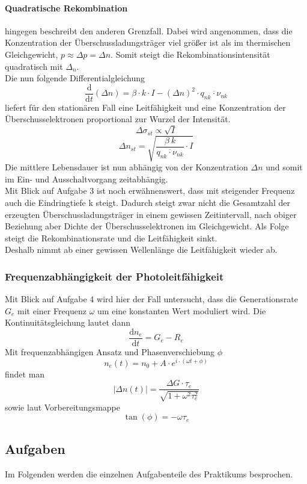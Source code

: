 \paragraph{Quadratische Rekombination} hingegen beschreibt den anderen Grenzfall. Dabei wird angenommen, dass die Konzentration der Überschussladungsträger viel größer ist als im thermischen Gleichgewicht, $p \approx \Delta p = \Delta n$. Somit steigt die Rekombinationsintensität quadratisch mit $\Delta _n$. \\
Die nun folgende Differentialgleichung 
$$\frac{\mathrm{d}}{\mathrm{d} t} (\Delta n) = \beta \cdot k \cdot I - (\Delta n)^{2} \cdot \overline{q_{nk} \cdot \nu _{nk}} $$
liefert für den stationären Fall eine Leitfähigkeit und eine Konzentration der Überschusselektronen proportional zur Wurzel der Intensität.
$$\Delta \sigma _{st} \propto \sqrt{I} $$
$$\Delta n_{st} = \sqrt{\frac{\beta \ k}{\overline{q_{nk} \cdot \nu _{nk}}} \cdot I}$$
Die mittlere Lebensdauer ist nun abhängig von der Konzentration $\Delta n$ und somit im Ein- und Ausschaltvorgang zeitabhängig. \\
Mit Blick auf Aufgabe 3 ist noch erwähnenswert, dass mit steigender Frequenz auch die Eindringtiefe k steigt. Dadurch steigt zwar nicht die Gesamtzahl der erzeugten Überschussladungsträger in einem gewissen Zeitintervall, nach obiger Beziehung aber Dichte der Überschusselektronen im Gleichgewicht. Als Folge steigt die Rekombinationsrate und die Leitfähigkeit sinkt. \\
Deshalb nimmt ab einer gewissen Wellenlänge die Leitfähigkeit wieder ab.

\subsubsection{Frequenzabhängigkeit der Photoleitfähigkeit}
Mit Blick auf Aufgabe 4 wird hier der Fall untersucht, dass die Generationsrate $G_e$ mit einer Frequenz $\omega$ um eine konstanten Wert moduliert wird. Die Kontinuitätsgleichung lautet dann
$$\frac{\mathrm{d} n_e}{\mathrm{d}t} = G_e - R_e$$
Mit frequenzabhängigen Ansatz und Phasenverschiebung $\phi$
$$ n_e (t) = n_0 + A \cdot e^{i \cdot (\omega t + \phi)} $$
findet man
$$\vert \Delta n(t) \vert = \frac{\Delta G \cdot \tau _e}{\sqrt{1 + \omega ^{2} \tau_e ^{2}}} $$
sowie laut Vorbereitungsmappe
$$\tan(\phi) = -\omega \tau _e $$

\subsection{Aufgaben}
Im Folgenden werden die einzelnen Aufgabenteile des Praktikums besprochen.
